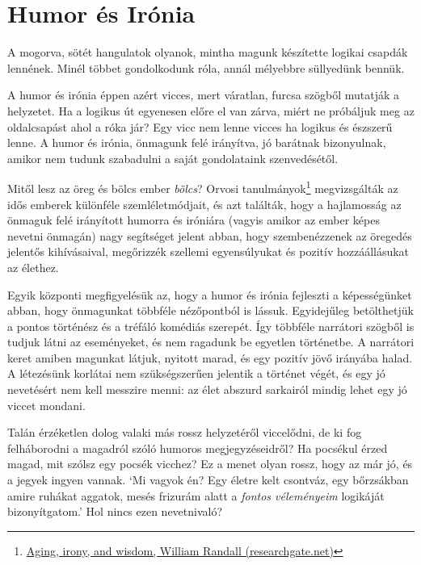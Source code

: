 \clearpage

\section{Humor és Irónia}


\noindent A mogorva, sötét hangulatok olyanok, mintha magunk készítette
logikai csapdák lennének. Minél többet gondolkodunk róla, annál
mélyebbre süllyedünk bennük.

A humor és irónia éppen azért vicces, mert váratlan, furcsa szögből
mutatják a helyzetet. Ha a logikus út egyenesen előre el van zárva,
miért ne próbáljuk meg az oldalcsapást ahol a róka jár? Egy vicc nem
lenne vicces ha logikus és észszerű lenne. A humor és irónia, önmagunk
felé irányítva, jó barátnak bizonyulnak, amikor nem tudunk szabadulni a
saját gondolataink szenvedésétől.

Mitől lesz az öreg és bölcs ember \emph{bölcs}? Orvosi
tanulmányok\footnote{\href{https://www.researchgate.net/publication/258190619_Aging_irony_and_wisdom_On_the_narrative_psychology_of_later_life}{Aging,
  irony, and wisdom, William Randall (researchgate.net)}} megvizsgálták
az idős emberek különféle szemléletmódjait, és azt találták, hogy a
hajlamosság az önmaguk felé irányított humorra és iróniára (vagyis
amikor az ember képes nevetni önmagán) nagy segítséget jelent abban,
hogy szembenézzenek az öregedés jelentős kihívásaival, megőrizzék
szellemi egyensúlyukat és pozitív hozzáállásukat az élethez.

Egyik központi megfigyelésük az, hogy a humor és irónia fejleszti a
képességünket abban, hogy önmagunkat többféle nézőpontból is lássuk.
Egyidejűleg betölthetjük a pontos történész és a tréfáló komédiás
szerepét. Így többféle narrátori szögből is tudjuk látni az eseményeket,
és nem ragadunk be egyetlen történetbe. A narrátori keret amiben
magunkat látjuk, nyitott marad, és egy pozitív jövő irányába halad. A
létezésünk korlátai nem szükségszerűen jelentik a történet végét, és egy
jó nevetésért nem kell messzire menni: az élet abszurd sarkairól mindig
lehet egy jó viccet mondani.

Talán érzéketlen dolog valaki más rossz helyzetéről viccelődni, de ki
fog felháborodni a magadról szóló humoros megjegyzéseidről? Ha pocsékul
érzed magad, mit szólsz egy pocsék vicchez? Ez a menet olyan rossz, hogy
az már jó, és a jegyek ingyen vannak. `Mi vagyok én? Egy életre kelt
csontváz, egy bőrzsákban amire ruhákat aggatok, mesés frizurám alatt a
\emph{fontos véleményeim} logikáját bizonyítgatom.' Hol nincs ezen
nevetnivaló?

